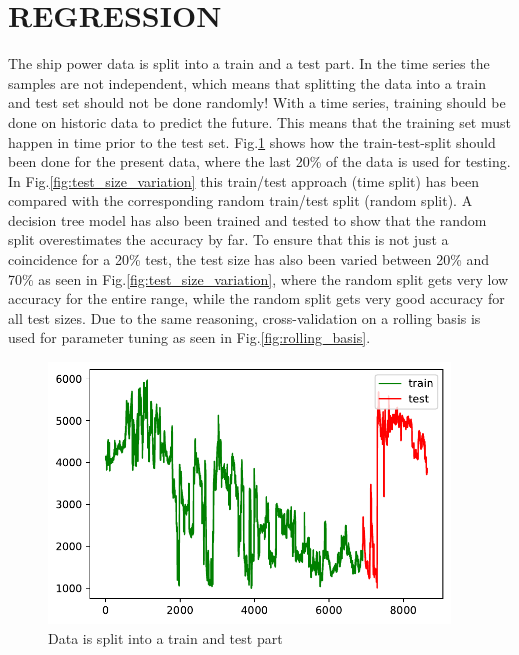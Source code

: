 \section*{REGRESSION}\label{regression}
The ship power data is split into a train and a test part. In the time
series the samples are not independent, which means that splitting the
data into a train and test set should not be done randomly! With a time
series, training should be done on historic data to predict the future.
This means that the training set must happen in time prior to the test
set. Fig.\ref{fig:train_test} shows how the train-test-split
should been done for the present data, where the last 20\% of the data
is used for testing.
In Fig.\ref{fig:test_size_variation} this train/test approach
(time split) has been compared with the corresponding random train/test
split (random split). A decision tree model has also been trained and
tested to show that the random split overestimates the accuracy by far.
To ensure that this is not just a coincidence for a 20\% test, the test
size has also been varied between 20\% and 70\% as seen in
Fig.\ref{fig:test_size_variation}, where the random split gets
very low accuracy for the entire range, while the random split gets very
good accuracy for all test sizes.
Due to the same reasoning, cross-validation on a rolling basis is used
for parameter tuning as seen in Fig.\ref{fig:rolling_basis}.
\begin{figure}[H]
\begin{center}\includegraphics[width = 0.95\textwidth]{figures/train_test.pdf}\end{center}
\vspace{-0.7cm}
\caption{Data is split into a train and test part}
\label{fig:train_test}
\end{figure}
